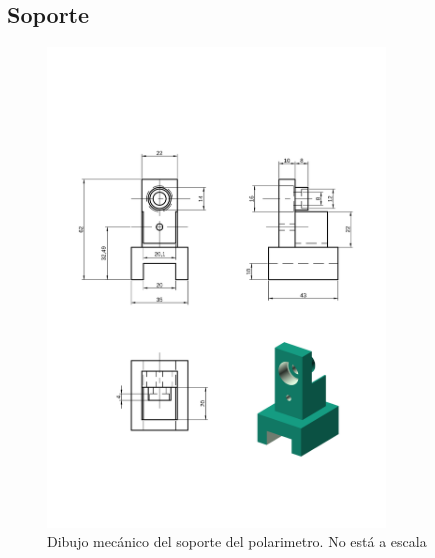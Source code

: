 \documentclass[12pt,a4paper]{article}
\begin{document}
    \subsection{Soporte}
    \begin{figure}[H]
    \centering
    \includegraphics[width=0.8\textwidth]{fig/polarimetro/soporte_mecanico}
    \caption{Dibujo mecánico del soporte del polarimetro. No está a escala}
    \label{fig:polarimetro/soporte_plano}
    \end{figure}
    \vfill
\end{document}
